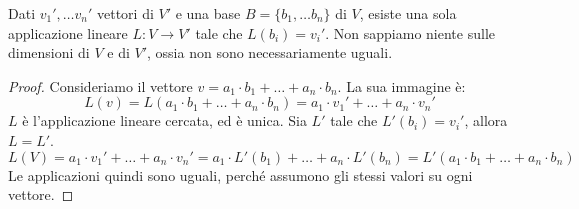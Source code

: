 \begin{prop}
Dati $v_1', \ldots v_n'$ vettori di $V'$ e una base $B = \{ b_1, \dots b_n \}$ di $V$, esiste una sola applicazione lineare $L : V \to V'$ tale che $L(b_i) = v_i'$. Non sappiamo niente sulle dimensioni di $V$ e di $V'$, ossia non sono necessariamente uguali.
\end{prop}
\begin{proof}
Consideriamo il vettore $v = a_1 \cdot b_1 + \ldots + a_n \cdot b_n$. La sua immagine \`e:
\[
L(v) = L(a_1 \cdot b_1 + \ldots + a_n \cdot b_n) = a_1 \cdot v_1' + \ldots + a_n \cdot v_n'
\]
$L$ \`e l'applicazione lineare cercata, ed \`e unica. Sia $L'$ tale che $L'(b_i) = v_i'$, allora $L = L'$.
\[
L(V) = a_1 \cdot v_1' + \ldots + a_n \cdot v_n' = a_1 \cdot L'(b_1) + \ldots + a_n \cdot L'(b_n) =  L' (a_1 \cdot b_1 + \ldots + a_n \cdot b_n)
\]
Le applicazioni quindi sono uguali, perch\'e assumono gli stessi valori su ogni vettore.
\end{proof}
